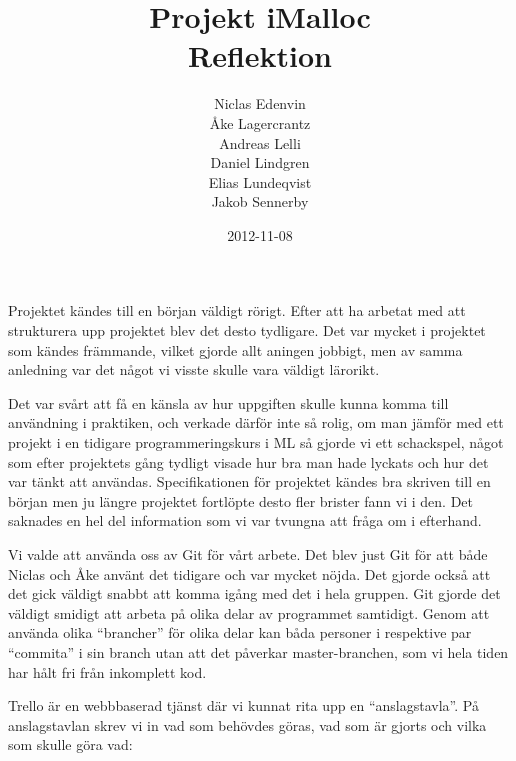 \documentclass{article}
\title{
  Projekt iMalloc \\
  Reflektion
}
\author{
  Niclas Edenvin \\
  Åke Lagercrantz \\
  Andreas Lelli \\
  Daniel Lindgren \\
  Elias Lundeqvist \\
  Jakob Sennerby
}
\date{2012-11-08}
\begin{document}
\maketitle

\newpage






Projektet kändes till en början väldigt rörigt. Efter att ha arbetat med att strukturera upp projektet blev det desto tydligare. Det var mycket i projektet som kändes främmande, vilket gjorde allt aningen jobbigt, men av samma anledning var det något vi visste skulle vara väldigt lärorikt. 

Det var svårt att få en känsla av hur uppgiften skulle kunna komma till användning i praktiken, och verkade därför inte så rolig, om man jämför med ett projekt i en tidigare programmeringskurs i ML så gjorde vi ett schackspel, något som efter projektets gång tydligt visade hur bra man hade lyckats och hur det var tänkt att användas. Specifikationen för projektet kändes bra skriven till en början men ju längre projektet fortlöpte desto fler brister fann vi i den. Det saknades en hel del information som vi var tvungna att fråga om i efterhand.

Vi valde att använda oss av Git för vårt arbete. Det blev just Git för att både Niclas och Åke använt det tidigare och var mycket nöjda. Det gjorde också att det gick väldigt snabbt att komma igång med det i hela gruppen. Git gjorde det väldigt smidigt att arbeta på olika delar av programmet samtidigt. Genom att använda olika “brancher” för olika delar kan båda personer i respektive par “commita” i sin branch utan att det påverkar master-branchen, som vi hela tiden har hålt fri från inkomplett kod.

Trello är en webbbaserad tjänst där vi kunnat rita upp en “anslagstavla”. På anslagstavlan skrev vi in vad som behövdes göras, vad som är gjorts och vilka som skulle göra vad:
\end{document}
